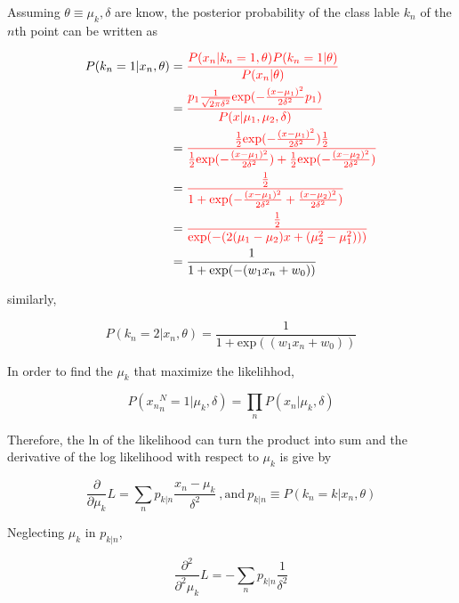 \documentclass[11pt]{article}
\begin{document}
Assuming $\theta \equiv {{\mu_k}, \delta}$ are know, the posterior probability of the class lable $k_n$ of the $n$th point can be written as

\begin{equation}
\begin{aligned}
P(k_n = 1 | x_n, \theta) &= \color{red}{\frac{P(x_n | k_n = 1, \theta)P(k_n = 1| \theta)}{P(x_n | \theta)}}
\\ &= \color{red}{\frac{p_1 \frac{1}{\sqrt{2\pi \delta^2}}\mathrm{exp}(-\frac{(x - \mu_1)^2}{2\delta^2}p_1)}{P(x | \mu_1, \mu_2, \delta)}}
\\ &= \color{red}{\frac{\frac{1}{2}\mathrm{exp}(-\frac{(x - \mu_1)^2}{2\delta^2})\frac{1}{2}}{\frac{1}{2}\mathrm{exp}(-\frac{(x - \mu_1)^2}{2\delta^2}) + \frac{1}{2}\mathrm{exp}(-\frac{(x - \mu_2)^2}{2\delta^2})}}
\\ &= \color{red}{\frac{\frac{1}{2}}{1 + \mathrm{exp}(- \frac{(x - \mu_1)^2}{2\delta^2} + \frac{(x - \mu_2)^2}{2\delta^2})}}
\\ &= \color{red}{\frac{\frac{1}{2}}{\mathrm{exp}(-(2(\mu_1 - \mu_2)x + (\mu_2^2 - \mu_1^2)))}}
\\ &= \frac{1}{1 + \mathrm{exp}(- (w_1 x_n + w_0))}
\end{aligned}
\end{equation}

similarly,

\begin{equation}
  P(k_n = 2 | x_n, \theta) = \frac{1}{1 + \mathrm{exp}((w_1 x_n + w_0))}
\end{equation}

In order to find the ${\mu_k}$ that maximize the likelihhod,

\begin{equation}
  P({x_n}^N_n=1 | {\mu_k}, \delta) = \prod_n P(x_n | {\mu_k}, \delta)
\end{equation}

Therefore, the $\mathrm{ln}$ of the likelihood can turn the product into sum and the derivative of the log likelihood with respect to $\mu_k$ is give by

\begin{equation}
  \frac{\partial}{\partial \mu_k} L = \sum_n p_{k|n} \frac{x_n - \mu_k}{\delta^2}\ , \text{and} \ p_{k|n} \equiv P(k_n = k | x_n, \theta)
\end{equation}

Neglecting $\mu_k$ in $p_{k|n}$,

\begin{equation}
  \frac{\partial^2}{\partial^2 \mu_k} L = -\sum_n p_{k|n} \frac{1}{\delta^2}
\end{equation}
\end{document}
